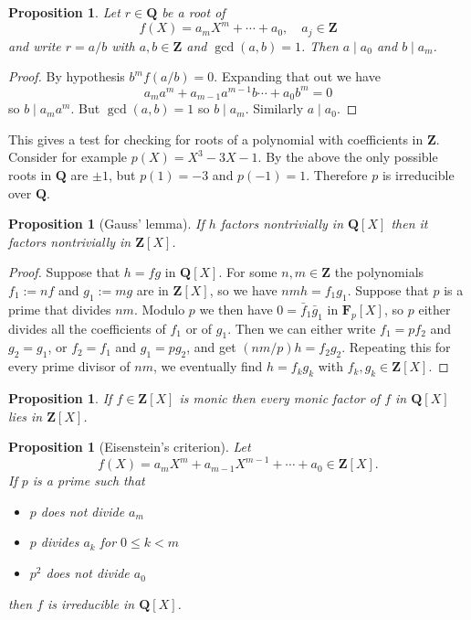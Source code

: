 \documentclass[11pt]{amsart}
\newtheorem{prop}[theo]{Proposition}
\theoremstyle{definition}
\def\FF{\mathbf{F}}
\def\QQ{\mathbf{Q}}
\def\ZZ{\mathbf{Z}}
\begin{document}
\begin{prop}
Let $r \in \QQ$ be a root of
\[
f(X) = a_m X^m + \cdots + a_0,
\quad
a_j \in \ZZ
\]
and write $r = a/b$ with $a,b \in \ZZ$ and $\gcd(a,b) = 1$.
Then $a \mid a_0$ and $b \mid a_m$.
\end{prop}

\begin{proof}
By hypothesis $b^m f(a/b) = 0$.
Expanding that out we have
\[
a_m a^m + a_{m-1} a^{m-1} b \cdots + a_0 b^m = 0
\]
so $b \mid a_m a^m$. But $\gcd(a,b) = 1$ so $b \mid a_m$.
Similarly $a \mid a_0$.
\end{proof}

This gives a test for checking for roots of a polynomial with coefficients in $\ZZ$.
Consider for example $p(X) = X^3 - 3X - 1$.
By the above the only possible roots in $\QQ$ are $\pm 1$, but $p(1) = -3$ and $p(-1) = 1$.
Therefore $p$ is irreducible over $\QQ$.



\begin{prop}[Gauss' lemma]
If $h$ factors nontrivially in $\QQ[X]$ then it factors nontrivially in $\ZZ[X]$.
\end{prop}

\begin{proof}
Suppose that $h = fg$ in $\QQ[X]$.
For some $n,m \in \ZZ$ the polynomials $f_1 := nf$ and $g_1 := mg$ are in $\ZZ[X]$, so we have $nm h = f_1g_1$.
Suppose that $p$ is a prime that divides $nm$.
Modulo $p$ we then have $0 = \bar f_1 \bar g_1$ in $\FF_p[X]$, so $p$ either divides all the coefficients of $f_1$ or of $g_1$.
Then we can either write $f_1 = p f_2$ and $g_2 = g_1$, or $f_2 = f_1$ and $g_1 = p g_2$, and get $(nm/p) h = f_2 g_2$.
Repeating this for every prime divisor of $nm$, we eventually find $h = f_k g_k$ with $f_k, g_k \in \ZZ[X]$.
\end{proof}



\begin{prop}
If $f \in \ZZ[X]$ is monic then every monic factor of $f$ in $\QQ[X]$ lies in $\ZZ[X]$.
\end{prop}



\begin{prop}[Eisenstein's criterion]
Let 
\[
f(X) = a_m X^m + a_{m-1} X^{m-1} + \cdots + a_0 \in \ZZ[X].
\]
If $p$ is a prime such that
\begin{itemize}
\item
$p$ does not divide $a_m$

\item
$p$ divides $a_k$ for $0 \leq k < m$

\item
$p^2$ does not divide $a_0$
\end{itemize}
then $f$ is irreducible in $\QQ[X]$.
\end{prop}
\end{document}
